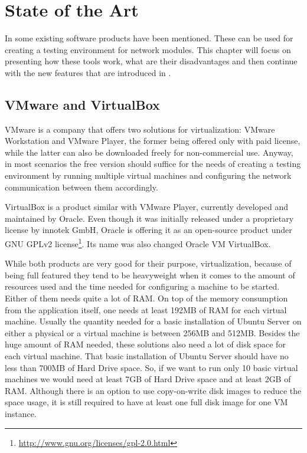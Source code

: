 \chapter{State of the Art}
\label{chapter:Chapter 2}

In  some existing software products have been mentioned.
These can be used for creating a testing environment for network modules.
This chapter will focus on presenting how these tools work, what are their disadvantages and then continue with the new features that are introduced in \project.

\section{VMware and VirtualBox}
\label{sec:vmw-vbox}

VMware is a company that offers two solutions for virtualization: VMware Workstation and VMware Player, the former being offered only with paid license, while the latter can also be downloaded freely for non-commercial use.
Anyway, in most scenarios the free version should suffice for the needs of creating a testing environment by running multiple virtual machines and configuring the network communication between them accordingly.

VirtualBox is a product similar with VMware Player, currently developed and maintained by Oracle.
Even though it was initially released under a proprietary license by innotek GmbH,  Oracle is offering it as an open-source product under GNU GPLv2 license\footnote{\url{http://www.gnu.org/licenses/gpl-2.0.html}}.
Its name was also changed Oracle VM VirtualBox.

While both products are very good for their purpose, virtualization, because of being full featured they tend to be heavyweight when it comes to the amount of resources used and the time needed for configuring a machine to be started.
Either of them needs quite a lot of RAM. On top of the memory consumption from the application itself, one needs at least 192MB of RAM for each virtual machine.
Usually the quantity needed for a basic installation of Ubuntu Server \cite{ubuntu-sysreq} on either a physical or a virtual machine is between 256MB and 512MB.
Besides the huge amount of RAM needed, these solutions also need a lot of disk space for each virtual machine.
That basic installation of Ubuntu Server should have no less than 700MB of Hard Drive space.
So, if we want to run only 10 basic virtual machines we would need at least 7GB of Hard Drive space and at least 2GB of RAM.
Although there is an option to use copy-on-write disk images to reduce the space usage, it is still required to have at least one full disk image for one VM instance.

